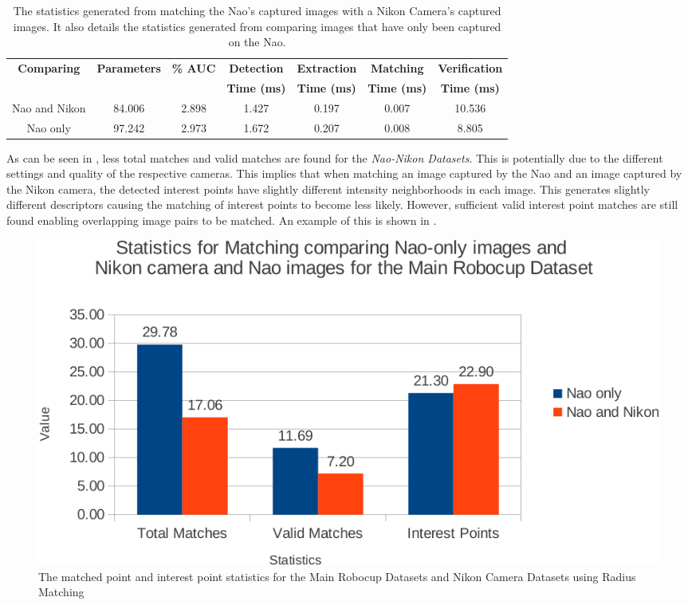 \begin{table}
\centering
\caption{The statistics generated from matching the Nao's captured images with
a Nikon Camera's captured images. It also details the statistics generated from comparing images that have only been captured on the Nao.}
\footnotesize
\begin{tabular}{|c|c|c|c|c|c|c|}
\hline 
\textbf{Comparing} & \textbf{Parameters} & \textbf{\% AUC} & \textbf{Detection} & \textbf{Extraction} & \textbf{Matching} & \textbf{Verification}\tabularnewline
 &  &  & \textbf{Time (ms)} & \textbf{Time (ms)} & \textbf{Time (ms)} & \textbf{Time (ms)}\tabularnewline
\hline 
\hline 
Nao and Nikon & 84.006 & 2.898 & 1.427 & 0.197 & 0.007 & 10.536\tabularnewline
\hline 
Nao only & 97.242 & 2.973 & 1.672 & 0.207 & 0.008 & 8.805\tabularnewline
\hline 
\end{tabular}
\label{tab:naoNikonRobocup}
\end{table}

As can be seen in , less total matches and valid matches are found for the \textit{Nao-Nikon Datasets}. This is potentially due to the different settings and quality of the respective cameras. This implies that when matching an image captured by the Nao and an image captured by the Nikon camera, the detected interest points have slightly different intensity neighborhoods in each image. This generates slightly different descriptors causing the matching of interest points to become less likely. However, sufficient valid interest point matches are still found enabling overlapping image pairs to be matched. An example of this is shown in .\\

\begin{figure}[h!] 
  \centering
    \includegraphics[width=1.0\textwidth]{../Drawings/Graphs/nikon_mrb_matches_keypoints_best.pdf}
    \caption{The matched point and interest point statistics for the Main Robocup Datasets
and Nikon Camera Datasets using Radius Matching}
    \label{fig:nikon_mrb_matches_keypoints}
\end{figure}

